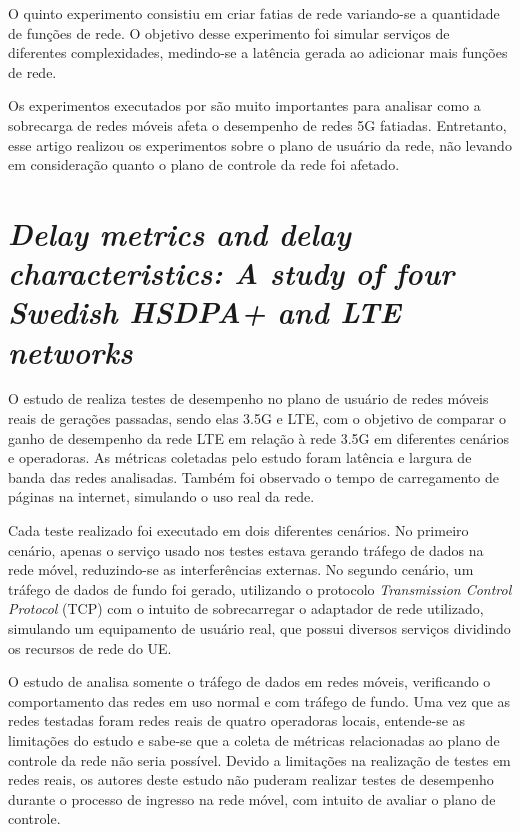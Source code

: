 O quinto experimento consistiu em criar fatias de rede variando-se a quantidade de funções de rede.
O objetivo desse experimento foi simular serviços de diferentes complexidades, medindo-se a latência gerada ao adicionar mais funções de rede.

Os experimentos executados por \cite{Lee2021} são muito importantes para analisar como a sobrecarga de redes móveis afeta o desempenho de redes 5G fatiadas.
Entretanto, esse artigo realizou os experimentos sobre o plano de usuário da rede, não levando em consideração quanto o plano de controle da rede foi afetado.

\section{\textit{Delay metrics and delay characteristics: A study of four Swedish HSDPA+ and LTE networks}}

O estudo de \cite{Garcia2015} realiza testes de desempenho no plano de usuário de redes móveis reais de gerações passadas, sendo elas 3.5G e LTE, com o objetivo de comparar o ganho de desempenho da rede LTE em relação à rede 3.5G em diferentes cenários e operadoras.
As métricas coletadas pelo estudo foram latência e largura de banda das redes analisadas.
Também foi observado o tempo de carregamento de páginas na internet, simulando o uso real da rede.

Cada teste realizado foi executado em dois diferentes cenários.
No primeiro cenário, apenas o serviço usado nos testes estava gerando tráfego de dados na rede móvel, reduzindo-se as interferências externas.
No segundo cenário, um tráfego de dados de fundo foi gerado, utilizando o protocolo \textit{Transmission Control Protocol} (TCP) com o intuito de sobrecarregar o adaptador de rede utilizado, simulando um equipamento de usuário real, que possui diversos serviços dividindo os recursos de rede do UE.

O estudo de \cite{Garcia2015} analisa somente o tráfego de dados em redes móveis, verificando o comportamento das redes em uso normal e com tráfego de fundo.
Uma vez que as redes testadas foram redes reais de quatro operadoras locais, entende-se as limitações do estudo e sabe-se que a coleta de métricas relacionadas ao plano de controle da rede não seria possível.
Devido a limitações na realização de testes em redes reais, os autores deste estudo não puderam realizar testes de desempenho durante o processo de ingresso na rede móvel, com intuito de avaliar o plano de controle.

